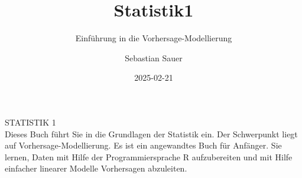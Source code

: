 \documentclass[
  letterpaper,
  twoside,
  open=any]{scrbook}
\title{Statistik1}
\subtitle{Einführung in die Vorhersage-Modellierung}
\author{Sebastian Sauer}
\date{2025-02-21}
\theoremstyle{definition}
\theoremstyle{definition}
\theoremstyle{definition}
\theoremstyle{remark}
\begin{document}

  \begin{frontmatter}



\begin{titlepage}
    \centering
    \vspace*{3cm}
    {\Huge STATISTIK 1\\}
    \vspace*{2cm}
    \noindent %
Dieses Buch führt Sie in die Grundlagen der Statistik ein.
Der Schwerpunkt liegt auf Vorhersage-Modellierung.
Es ist ein angewandtes Buch für Anfänger.
Sie lernen, Daten mit Hilfe der Programmiersprache R aufzubereiten 
und mit Hilfe einfacher linearer Modelle Vorhersagen abzuleiten.    

    \vfill
\end{titlepage}


\newpage
\null
\thispagestyle{empty} %
\newpage



\begin{titlepage}


\newcommand{\titlepagepagealign}{
\ifthenelse{\equal{center}{right}}{\raggedleft}{}
\ifthenelse{\equal{center}{center}}{\centering}{}
\ifthenelse{\equal{center}{left}}{\raggedright}{}
}


\newcommand{\titleandsubtitle}{
{\fontsize{30}{36.0}\selectfont
{\uppercase{\nohyphens{Statistik1}}}\par
}%

\vspace{\betweentitlesubtitle}
{
{\Large{\textit{\nohyphens{Einführung in die
Vorhersage-Modellierung}}}}\par
}}
\newcommand{\titlepagetitleblock}{
\rule{\textwidth}{0.4pt} %
\vspace{0.025\textheight} %

\titleandsubtitle

\vspace{0.025\textheight} 
\rule{0.3\textwidth}{0.4pt} %
}
\newcommand{\authorstyle}[1]{{\Large{#1}}}

\newcommand{\affiliationstyle}[1]{{\large{#1}}}

\newcommand{\titlepageauthorblock}{
{\authorstyle{\nohyphens{Sebastian Sauer}\\}}
}


\end{titlepage}
\end{frontmatter}
\end{document}
